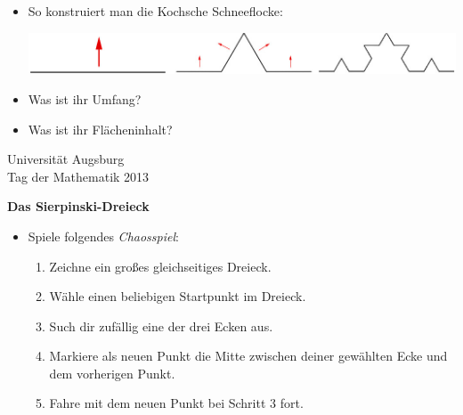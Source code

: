 \documentclass[a4paper,ngerman]{scrartcl}
\newcommand{\drawHere}{%
  \begin{center}%
    \fbox{\parbox[c][0.9\textwidth]{0.9\textwidth}{\ }}%
  \end{center}}
\newcommand{\header}{%
  \begin{raggedleft}
  \tiny Universität Augsburg \\
  Tag der Mathematik 2013 \par
  \end{raggedleft}}
\begin{document}
\begin{itemize}
  \item So konstruiert man die Kochsche Schneeflocke:

  \begin{center}
    \includegraphics[scale=0.5]{koch}
  \end{center}
  \item Was ist ihr Umfang?
  \item Was ist ihr Flächeninhalt?
\end{itemize}

\newpage

\header

\begin{center}
  \Huge\bf
  Das Sierpinski-Dreieck
\end{center}

\vfill
\drawHere

\vfill
\Large

\renewcommand{\labelitemi}{$\blacktriangle$}

\begin{itemize}
  \item Spiele folgendes \emph{Chaosspiel}:
  \begin{enumerate}
    \item Zeichne ein großes gleichseitiges Dreieck.
    \item Wähle einen beliebigen Startpunkt im Dreieck.
    \item Such dir zufällig eine der drei Ecken aus.
    \item Markiere als neuen Punkt die Mitte zwischen deiner gewählten Ecke und \\ dem
    vorherigen Punkt.
    \item Fahre mit dem neuen Punkt bei Schritt 3 fort.
  \end{enumerate}
\end{itemize}
\end{document}
